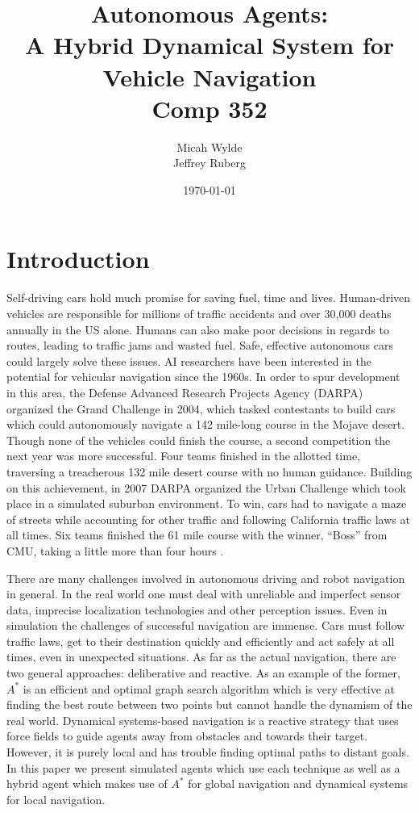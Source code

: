 \documentclass{article}
\author{Micah Wylde\\Jeffrey Ruberg}
\date{\today}
\title{Autonomous Agents:\\
A Hybrid Dynamical System for Vehicle Navigation\\
Comp 352}
\begin{document}
\maketitle

\section{Introduction}
Self-driving cars hold much promise for saving fuel, time and
lives. Human-driven vehicles are responsible for millions of traffic accidents
and over 30,000 deaths annually in the US alone. Humans can also make poor
decisions in regards to routes, leading to traffic jams and wasted fuel. Safe,
effective autonomous cars could largely solve these issues. AI researchers have
been interested in the potential for vehicular navigation since the 1960s. In
order to spur development in this area, the Defense Advanced Research Projects
Agency (DARPA) organized the Grand Challenge in 2004, which tasked contestants
to build cars which could autonomously navigate a 142 mile-long course in the
Mojave desert. Though none of the vehicles could finish the course, a second
competition the next year was more successful. Four teams finished in the
allotted time, traversing a treacherous 132 mile desert course with no human
guidance. Building on this achievement, in 2007 DARPA organized the Urban
Challenge which took place in a simulated suburban environment. To win, cars had
to navigate a maze of streets while accounting for other traffic and following
California traffic laws at all times. Six teams finished the 61 mile course with
the winner, ``Boss'' from CMU, taking a little more than four hours
\cite{robotic_cars}.

There are many challenges involved in autonomous driving and robot navigation in
general. In the real world one must deal with unreliable and imperfect sensor
data, imprecise localization technologies and other perception issues. Even in
simulation the challenges of successful navigation are immense. Cars must follow
traffic laws, get to their destination quickly and efficiently and act safely at
all times, even in unexpected situations. As far as the actual navigation, there
are two general approaches: deliberative and reactive. As an example of the
former, $A^*$ is an efficient and optimal graph search algorithm which is very
effective at finding the best route between two points but cannot handle the
dynamism of the real world. Dynamical systems-based navigation is a reactive
strategy that uses force fields to guide agents away from obstacles and towards
their target. However, it is purely local and has trouble finding optimal paths
to distant goals. In this paper we present simulated agents which use each
technique as well as a hybrid agent which makes use of $A^*$ for global
navigation and dynamical systems for local navigation.
\end{document}
